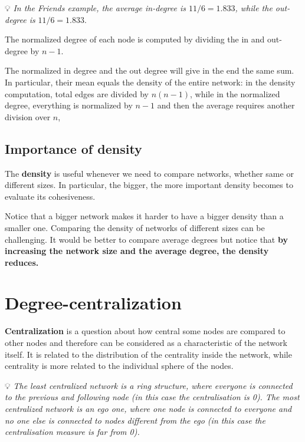 \documentclass[
  notitlepage,
  onecolumn,
  openany]{book}
\begin{document}
💡 \emph{In the Friends example, the average in-degree is \(11/6 = 1.833\), while the out-degree is} \(11/6 = 1.833\).

The normalized degree of each node is computed by dividing the in and out-degree by \(n-1\).

The normalized in degree and the out degree will give in the end the same sum. In particular, their mean equals the density of the entire network: in the density computation, total edges are divided by \(n(n-1)\), while in the normalized degree, everything is normalized by \(n-1\) and then the average requires another division over \(n\),

\hypertarget{importance-of-density}{%
\subsection{Importance of density}\label{importance-of-density}}

The \textbf{density} is useful whenever we need to compare networks, whether same or different sizes. In particular, the bigger, the more important density becomes to evaluate its cohesiveness.

Notice that a bigger network makes it harder to have a bigger density than a smaller one. Comparing the density of networks of different sizes can be challenging. It would be better to compare average degrees but notice that \textbf{by increasing the network size and the average degree, the density reduces.}

\hypertarget{degree-centralization}{%
\section{Degree-centralization}\label{degree-centralization}}

\textbf{Centralization} is a question about how central some nodes are compared to other nodes and therefore can be considered as a characteristic of the network itself. It is related to the distribution of the centrality inside the network, while centrality is more related to the individual sphere of the nodes.

💡 \emph{The least centralized network is a ring structure, where everyone is connected to the previous and following node (in this case the centralisation is 0).
The most centralized network is an ego one, where one node is connected to everyone and no one else is connected to nodes different from the ego (in this case the centralisation measure is far from 0).}
\end{document}
